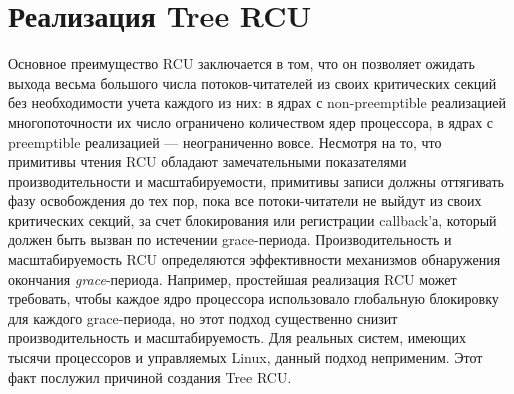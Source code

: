 \section{Реализация Tree RCU}\label{sec:tree_rcu}

Основное преимущество RCU заключается в том, что он позволяет
ожидать выхода весьма большого числа потоков-читателей из своих
критических секций без необходимости учета каждого из них:
в ядрах с non-preemptible реализацией многопоточности их число
ограничено количеством ядер процессора,
в ядрах с preemptible реализацией --- неограниченно вовсе.
Несмотря на то, что примитивы чтения RCU обладают замечательными
показателями производительности и масштабируемости,
примитивы записи должны оттягивать фазу освобождения до тех пор,
пока все потоки-читатели не выйдут из своих критических секций,
за счет блокирования или регистрации callback'а, который должен быть
вызван по истечении grace-периода.
Производительность и масштабируемость RCU определяются
эффективности механизмов обнаружения окончания \emph{grace}-периода.
Например, простейшая реализация RCU может требовать,
чтобы каждое ядро процессора использовало глобальную блокировку
для каждого grace-периода, но этот подход существенно снизит
производительность и масштабируемость.
Для реальных систем, имеющих тысячи процессоров и управляемых Linux,
данный подход неприменим. Этот факт послужил причиной создания Tree RCU.

